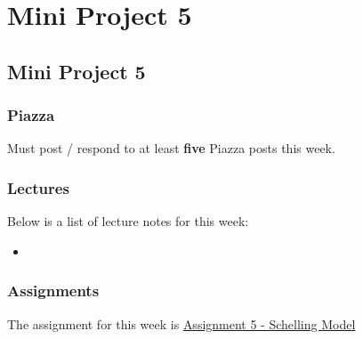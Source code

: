 \clearpage

\renewcommand{\ChapTitle}{Mini Project 5}
\renewcommand{\SectionTitle}{Mini Project 5}

\chapter{\ChapTitle}
\section{\SectionTitle}

\subsection{Piazza}

Must post / respond to at least \textbf{five} Piazza posts this week.  

\subsection{Lectures}

\noindent Below is a list of lecture notes for this week:

\begin{itemize}
    \item {}
\end{itemize}

\subsection{Assignments}

The assignment for this week is \href{https://github.com/QuantumCompiler/CU/tree/main/CSPB%203702%20-%20Cognitive%20Science/CSPB%203702%20-%20Assignments/CSPB%203702%20-%20Assignment%205%20-%20Schelling%20Model}{Assignment 5 - Schelling Model}  